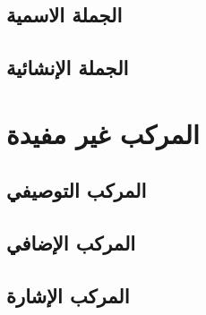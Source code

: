 \documentclass[11pt,twoside]{book}
\begin{document}


\section{الجملة الاسمية}



\section{الجملة الإنشائية}



\chapter{المركب غير مفيدة}



\section{المركب التوصيفي}



\section{المركب الإضافي}



\section{المركب الإشارة}





% 

\end{document}
